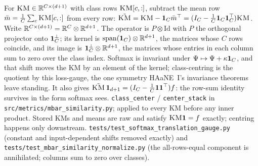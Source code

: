 {For $\textsc{KM}\in\mathbb{R}^{C\times(d+1)}$ with class rows $\textsc{KM}[c,:]$, subtract the mean row $\bar m=\tfrac1C\sum_c \textsc{KM}[c,:]$ from every row: $\tilde{\textsc{KM}}=\textsc{KM}-\boldsymbol{1}_C\bar m^\top=(I_C-\tfrac1C\boldsymbol{1}_C\boldsymbol{1}_C^\top)\textsc{KM}$.}
{Write $\mathbb{R}^{C\times(d+1)}=\mathbb{R}^C\otimes\mathbb{R}^{d+1}$. The operator is $P\otimes\mathrm{Id}$ with $P$ the orthogonal projector onto $\boldsymbol{1}_C^\perp$; its kernel is $\mathrm{span}(\boldsymbol{1}_C)\otimes\mathbb{R}^{d+1}$, the matrices whose $C$ rows coincide, and its image is $\boldsymbol{1}_C^\perp\otimes\mathbb{R}^{d+1}$, the matrices whose entries in each column sum to zero over the class index. Softmax is invariant under $\Psi\mapsto\Psi+\kappa\boldsymbol{1}_C$, and that shift moves the KM by an element of the kernel; class-centring is the quotient by this loss-gauge, the one symmetry HAaNE~I's invariance theorems leave standing. It also gives $\tilde{\textsc{KM}}\,\boldsymbol{1}_{d+1}=(I_C-\tfrac1C\boldsymbol{1}\boldsymbol{1}^\top)f$: the row-sum identity survives in the form softmax sees.}
{\texttt{class\_center} / \texttt{center\_stack} in \texttt{src/metrics/mbar\_similarity.py}; applied to every KM before any inner product. Stored KMs and means are raw and satisfy $\textsc{KM}\boldsymbol{1}=f$ exactly; centring happens only downstream.}
{\texttt{tests/test\_softmax\_translation\_gauge.py} (constant and input-dependent shifts removed exactly) and \texttt{tests/test\_mbar\_similarity\_normalize.py} (the all-rows-equal component is annihilated; columns sum to zero over classes).}
